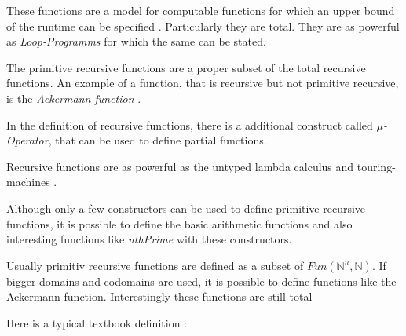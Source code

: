 \documentclass{jfp}
\begin{document}
These functions are a model for computable functions for which an upper bound of the runtime can be specified . Particularly they are total.
They are as powerful as  \emph{Loop-Programms}  \cite{loopsRitchie} for which the same can be stated.

The primitive recursive functions are a proper subset of the  total recursive functions. An example of a function, that is recursive but not primitive recursive, is the \emph{Ackermann function} \cite{szasz1991machine}.

In the definition of recursive functions, there is a additional construct called $\mu$\emph{-Operator}, that can be used to define partial functions.

Recursive functions are as powerful as the untyped lambda calculus and touring-machines \cite{threeModels} \cite[92-94]{ziegler2017godelsche}.

Although  only a few constructors can be used to define primitive recursive functions, it is possible to define the basic arithmetic functions and also interesting functions like  \emph{nthPrime} with these constructors.



Usually primitiv recursive functions are defined as a subset of $Fun(\mathbb{N}^n, \mathbb{N})$. If bigger domains and codomains are used, it is possible to define functions like the Ackermann function. Interestingly these functions are still total \cite{DBLP:journals/corr/Widemann16} 


Here is a typical textbook definition\cite{martin2019logik} \cite{wiki:Primitive_recursive_function} :
\end{document}
